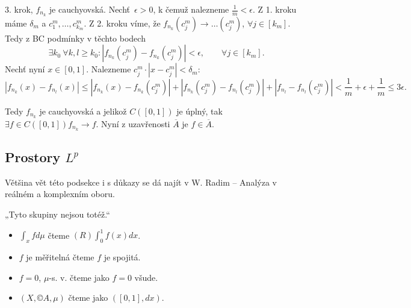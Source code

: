 \documentclass[12pt]{article}					%
\begin{document}
\begin{veta}
\begin{dukazin}
				3. krok, $f_{n_k}$ je cauchyovská. Nechť $\epsilon > 0$, k čemuž nalezneme $\frac{1}{m} < \epsilon$. Z 1. kroku máme $\delta_m$ a $c_1^m, …, c_{k_m}^m$. Z 2. kroku víme, že $f_{n_k}(c_j^m) \rightarrow …(c_j^m)$, $\forall j \in [k_m]$. Tedy z BC podmínky v těchto bodech
				$$ \exists k_0\ \forall k, l ≥ k_0: |f_{n_k}(c_j^m) - f_{n_k}(c_j^m)| < \epsilon, \qquad \forall j \in [k_m]. $$
				Nechť nyní $x \in [0, 1]$. Nalezneme $c_j^m·|x - c_j^m|< \delta_m$:
				$$ |f_{n_k}(x) - f_{n_l}(x)| ≤ |f_{n_k}(x) - f_{n_k}(c_j^m)| + |f_{n_k}(c_j^m) - f_{n_l}(c_j^m)| + |f_{n_l} - f_{n_l}(c_j^m)| < \frac{1}{m} + \epsilon + \frac{1}{m} ≤ 3\epsilon. $$

				Tedy $f_{n_k}$ je cauchyovská a jelikož $C([0, 1])$ je úplný, tak $\exists f \in C([0, 1])f_{n_k} \rightarrow f$. Nyní z uzavřenosti $\overline{A}$ je $f \in \overline{A}$.
			\end{dukazin}
		\end{veta}

	\subsection{Prostory $L^p$}
		\begin{poznamka}
			Většina vět této podsekce i s důkazy se dá najít v W. Radim – Analýza v reálném a komplexním oboru.
		\end{poznamka}

		\begin{poznamka}
			„Tyto skupiny nejsou totéž.“
			
			\begin{itemize}
				\item $\int_x f d\mu$ čteme $(R)\int_0^1 f(x) dx$.
				\item $f$ je měřitelná čteme $f$ je spojitá.
				\item $f=0$, $\mu$-s. v. čteme jako $f=0$ všude.
				\item $(X, ©A, \mu)$ čteme jako $([0, 1], dx)$.
			\end{itemize}
		\end{poznamka}
\end{document}
